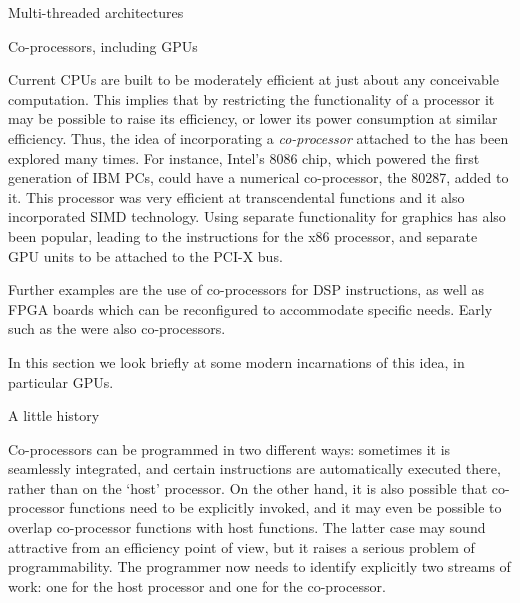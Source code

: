 
 {Multi-threaded architectures}
\label{sec:mta}


 {Co-processors, including GPUs}
\label{sec:copprocessor}

Current CPUs are built to be moderately efficient at just about any
conceivable computation. This implies that by restricting the
functionality of a processor it may be possible to raise its
efficiency, or lower its power consumption at similar
efficiency. Thus, the idea of incorporating a \emph{co-processor}
attached to the 
has been explored many times. For instance, Intel's 8086 chip, which
powered the first generation of IBM PCs, could have a numerical
co-processor, the 80287, added to it. This processor was very
efficient at transcendental functions and it also incorporated
\ac{SIMD} technology. Using separate functionality for graphics has also
been popular, leading to the  instructions for the x86 processor,
and separate \ac{GPU} units to be attached to the PCI-X bus.

Further examples are the use of co-processors
  for \ac{DSP} instructions, as well as \ac{FPGA} boards which can be
  reconfigured to accommodate specific needs.
Early 
such as the  were also co-processors.

In this section we look briefly at some modern incarnations of this idea,
in particular \acp{GPU}.

 {A little history}

Co-processors can be programmed in two different ways: sometimes 
it is seamlessly integrated, and certain instructions are
automatically executed there, rather than on the `host' processor. On
the other hand, it is also possible that co-processor functions need
to be explicitly invoked, and it may even be possible to overlap
co-processor functions with host functions. The latter case may sound
attractive from an efficiency point of view, but it raises a serious
problem of programmability. The programmer now needs to identify
explicitly two streams of work: one for the host processor and one for
the co-processor.

